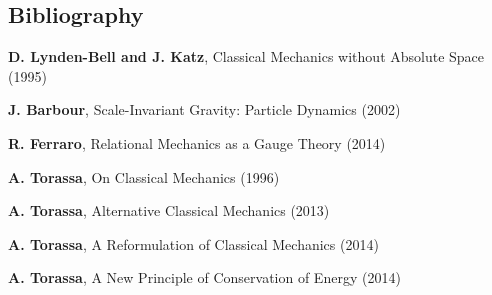 \documentclass[10pt]{article}
\begin{document}
\vspace{+1.50em}

{\centering\subsection*{Bibliography}}

\vspace{+1.20em}

\par \textbf{D. Lynden-Bell and J. Katz}, Classical Mechanics without Absolute Space (1995)
\bigskip
\par \textbf{J. Barbour}, Scale-Invariant Gravity: Particle Dynamics (2002)
\bigskip
\par \textbf{R. Ferraro}, Relational Mechanics as a Gauge Theory (2014)
\bigskip
\par \textbf{A. Torassa}, On Classical Mechanics (1996)
\bigskip
\par \textbf{A. Torassa}, Alternative Classical Mechanics (2013)
\bigskip
\par \textbf{A. Torassa}, A Reformulation of Classical Mechanics (2014)
\bigskip
\par \textbf{A. Torassa}, A New Principle of Conservation of Energy (2014)

\newpage
\end{document}

